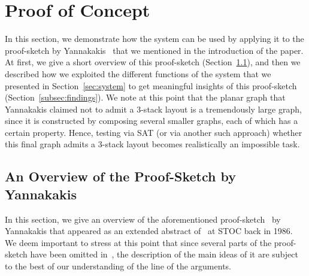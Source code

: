 \documentclass[runningheads]{llncs}
\begin{document}

\section{Proof of Concept}
\label{sec:proof-of-concept}

In this section, we demonstrate how the system can be used by applying it to the proof-sketch by Yannakakis~\cite{DBLP:conf/stoc/Yannakakis86} that we mentioned in the introduction of the paper. At first, we give a short overview of this proof-sketch (Section~\ref{subsec:Yannakakis}), and then we described how we exploited the different functions of the system that we presented in Section~\ref{sec:system} to get meaningful insights of this proof-sketch (Section~\ref{subsec:findings}). We note at this point that the planar graph that Yannakakis claimed not to admit a $3$-stack layout is a tremendously large graph, since it is constructed by composing several smaller graphs, each of which has a certain property. Hence, testing via SAT (or via another such approach) whether this final graph admits a $3$-stack layout becomes realistically an impossible task. 

\subsection{An Overview of the Proof-Sketch by Yannakakis}
\label{subsec:Yannakakis}

In this section, we give an overview of the aforementioned proof-sketch~\cite{DBLP:conf/stoc/Yannakakis86} by Yannakakis that appeared as an extended abstract of~\cite{DBLP:journals/jcss/Yannakakis89} at STOC back in 1986. We deem important to stress at this point that since several parts of the proof-sketch have been omitted in~\cite{DBLP:conf/stoc/Yannakakis86}, the description of the main ideas of it are subject to the best of our understanding of the line of the arguments. 
\end{document}
